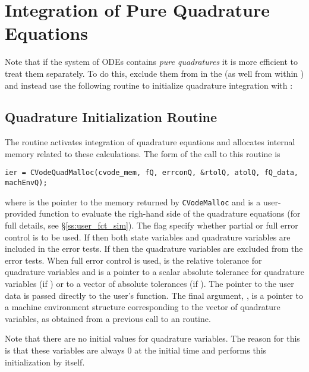 \section{Integration of Pure Quadrature Equations}
Note that if the system of ODEs contains {\em pure quadratures} it is more efficient
to treat them separately. To do this, exclude them from  in the 
 (as well from within ) and instead use the following 
routine to initialize quadrature integration with {\cvodes}:

\subsection{Quadrature Initialization Routine}\label{sss:cvodequadmalloc}

The routine  activates integration of quadrature equations 
and allocates internal memory related to these calculations.
The form of the call to this routine is
\begin{verbatim}
ier = CVodeQuadMalloc(cvode_mem, fQ, errconQ, &rtolQ, atolQ, fQ_data, machEnvQ);  
\end{verbatim}
where  is the pointer to the {\cvodes} memory returned by {\tt CVodeMalloc}
and  is a user-provided {\C} function to evaluate the righ-hand side of the
quadrature equations (for full details, see \S\ref{ss:user_fct_sim}). 
The flag  specify whether partial or full error 
control is to be used. If  then both state variables and
quadrature variables are included in the error tests. 
If  then the quadrature variables are excluded from the 
error tests. When full error control is used,  is the relative tolerance for
quadrature variables and  is a pointer to a scalar absolute tolerance for
quadrature variables (if ) or to a vector of absolute tolerances 
(if ). The pointer to the user data  is passed
directly to the user's  function. The final argument, ,
is a pointer to a machine environment structure corresponding to the
vector of quadrature variables, as obtained from a previous call to an
 routine.

Note that there are no initial values for quadrature variables. The reason for this is 
that these variables are always $0$ at the initial time and {\cvodes} performs this
initialization by itself.

